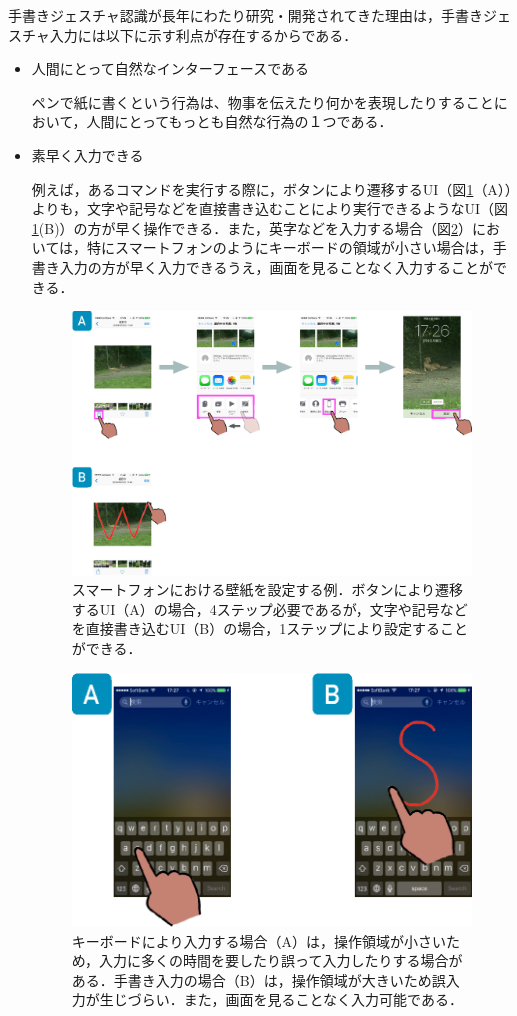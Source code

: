 手書きジェスチャ認識が長年にわたり研究・開発されてきた理由は，手書きジェスチャ入力には以下に示す利点が存在するからである．
\begin{itemize}
 \item 人間にとって自然なインターフェースである
 
ペンで紙に書くという行為は、物事を伝えたり何かを表現したりすることにおいて，人間にとってもっとも自然な行為の１つである．
 \item 素早く入力できる
 
例えば，あるコマンドを実行する際に，ボタンにより遷移するUI（図\ref{fig:wallpaper}（A））よりも，文字や記号などを直接書き込むことにより実行できるようなUI（図\ref{fig:wallpaper}(B)）の方が早く操作できる．また，英字などを入力する場合（図\ref{fig:keyinput}）においては，特にスマートフォンのようにキーボードの領域が小さい場合は，手書き入力の方が早く入力できるうえ，画面を見ることなく入力することができる．

\begin{figure} [htbp]
\centering
\includegraphics [width=0.85\columnwidth]{img/wallpaper.eps}
\caption{スマートフォンにおける壁紙を設定する例．ボタンにより遷移するUI（A）の場合，4ステップ必要であるが，文字や記号などを直接書き込むUI（B）の場合，1ステップにより設定することができる．}
\label{fig:wallpaper}
\end{figure}

\begin{figure} [htbp]
\centering
\includegraphics [width=0.5\columnwidth]{img/keyinput.eps}
\caption{キーボードにより入力する場合（A）は，操作領域が小さいため，入力に多くの時間を要したり誤って入力したりする場合がある．手書き入力の場合（B）は，操作領域が大きいため誤入力が生じづらい．また，画面を見ることなく入力可能である．}
\label{fig:keyinput}
\end{figure}


\end{itemize}
